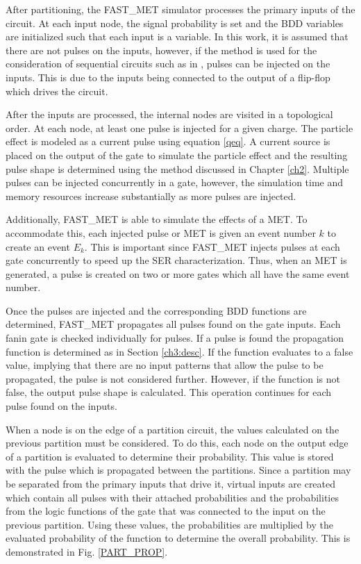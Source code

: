 After partitioning, the FAST\_MET simulator processes the primary inputs of the circuit. At each input node, the signal probability is set and the BDD variables are initialized such that each input is a variable. In this work, it is assumed that there are not pulses on the inputs, however, if the method is used for the consideration of sequential circuits such as in \cite{MiskovZivanov2007}, pulses can be injected on the inputs. This is due to the inputs being connected to the output of a flip-flop which drives the circuit.

After the inputs are processed, the internal nodes are visited in a topological order. At each node, at least one pulse is injected for a given charge. The particle effect is modeled as a current pulse using equation \ref{qeq}. A current source is placed on the output of the gate to simulate the particle effect and the resulting pulse shape is determined using the method discussed in Chapter \ref{ch2}. Multiple pulses can be injected concurrently in a gate, however, the simulation time and memory resources increase substantially as more pulses are injected.

Additionally, FAST\_MET is able to simulate the effects of a MET. To accommodate this, each injected pulse or MET is given an event number $k$ to create an event $E_k$. This is important since FAST\_MET injects pulses at each gate concurrently to speed up the SER characterization. Thus, when an MET is generated, a pulse is created on two or more gates which all have the same event number.

Once the pulses are injected and the corresponding BDD functions are determined, FAST\_MET propagates all pulses found on the gate inputs. Each fanin gate is checked individually for pulses. If a pulse is found the propagation function is determined as in Section \ref{ch3:desc}. If the function evaluates to a false value, implying that there are no input patterns that allow the pulse to be propagated, the pulse is not considered further. However, if the function is not false, the output pulse shape is calculated. This operation continues for each pulse found on the inputs. 

When a node is on the edge of a partition circuit, the values calculated on the previous partition must be considered. To do this, each node on the output edge of a partition is evaluated to determine their probability. This value is stored with the pulse which is propagated between the partitions. Since a partition may be separated from the primary inputs that drive it, virtual inputs are created which contain all pulses with their attached probabilities and the probabilities from the logic functions of the gate that was connected to the input on the previous partition. Using these values, the probabilities are multiplied by the evaluated probability of the function to determine the overall probability. This is demonstrated in Fig. \ref{PART_PROP}.

